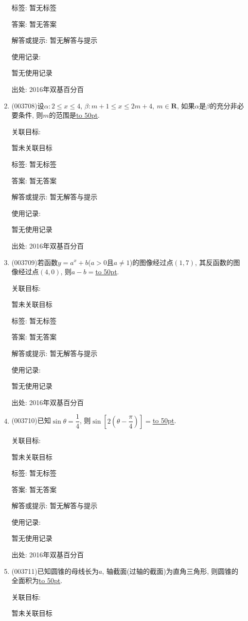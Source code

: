 \documentclass[10pt,a4paper]{article}
\newcommand{\blank}[1]{\underline{\hbox to #1pt{}}}
\begin{document}
\begin{enumerate}[1.]
标签: 暂无标签

答案: 暂无答案

解答或提示: 暂无解答与提示

使用记录:

暂无使用记录


出处: 2016年双基百分百
\item { (003708)}设$\alpha:2\le x\le 4$, $\beta: m+1\le x\le 2m+4, \ m\in \mathbf{R}$, 如果$\alpha$是$\beta$的充分非必要条件, 则$m$的范围是\blank{50}.


关联目标:

暂未关联目标



标签: 暂无标签

答案: 暂无答案

解答或提示: 暂无解答与提示

使用记录:

暂无使用记录


出处: 2016年双基百分百
\item { (003709)}若函数$y=a^x+b$($a>0$且$a\ne 1$)的图像经过点$(1,7)$, 其反函数的图像经过点$(4,0)$, 则$a-b=$\blank{50}.


关联目标:

暂未关联目标



标签: 暂无标签

答案: 暂无答案

解答或提示: 暂无解答与提示

使用记录:

暂无使用记录


出处: 2016年双基百分百
\item { (003710)}已知$\sin\theta=\dfrac 14$, 则$\sin\left[2\left(\theta-\dfrac\pi 4\right)\right]=$\blank{50}.


关联目标:

暂未关联目标



标签: 暂无标签

答案: 暂无答案

解答或提示: 暂无解答与提示

使用记录:

暂无使用记录


出处: 2016年双基百分百
\item { (003711)}已知圆锥的母线长为$a$, 轴截面(过轴的截面)为直角三角形, 则圆锥的全面积为\blank{50}.


关联目标:

暂未关联目标




\end{enumerate}
\end{document}
